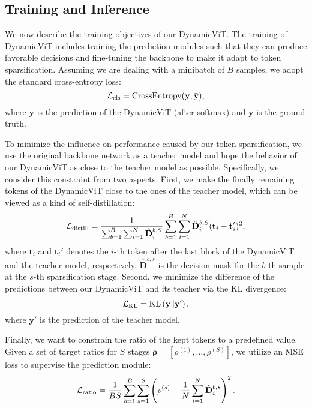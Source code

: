 \documentclass{article}
\newcommand{\dynamvit}{DynamicViT}
\DeclareMathOperator{\kld}{KL}
\DeclareMathOperator{\CE}{CrossEntropy}
\begin{document}
\subsection{Training and Inference}
We now describe the training objectives of our \dynamvit{}. The training of \dynamvit{} includes training the prediction modules such that they can produce favorable decisions and fine-tuning the backbone to make it adapt to token sparsification. Assuming we are dealing with a minibatch of $B$ samples, we adopt the standard cross-entropy loss:
\begin{equation}
    \mathcal{L}_{\rm cls} = \CE(\mathbf{y}, \bar{\mathbf{y}}),
\end{equation}
where $\mathbf{y}$ is the prediction of the \dynamvit{} (after softmax) and $\bar{\mathbf{y}}$ is the ground truth. 

To minimize the influence on performance caused by our token sparsification, we use the original backbone network as a teacher model and hope the behavior of our \dynamvit{} as close to the teacher model as possible. Specifically, we consider this constraint from two aspects. First, we make the finally remaining tokens of the \dynamvit{} close to the ones of the teacher model, which can be viewed as a kind of self-distillation:
\begin{equation}
    \mathcal{L}_{\rm distill} = \frac{1}{\sum_{b=1}^B\sum_{i=1}^N \hat{\mathbf{D}}_i^{b, S}}\sum_{b=1}^B\sum_{i=1}^N \hat{\mathbf{D}}_i^{b, S} (\mathbf{t}_{i} - \mathbf{t}_i')^2,
\end{equation}
where $\mathbf{t}_{i}$ and $\mathbf{t}_i'$ denotes the $i$-th token after the last block of the \dynamvit{} and the teacher model, respectively. $\hat{\mathbf{D}}^{b, s}$ is the decision mask for the $b$-th sample at the $s$-th sparsification stage. Second, we minimize the difference of the predictions between our \dynamvit{} and its teacher via the KL divergence:
\begin{equation}
    \mathcal{L}_{\rm KL} = \kld\left(\mathbf{y}\| \mathbf{y}'\right),
\end{equation}
where $\mathbf{y}'$ is the prediction of the teacher model. 

Finally, we want to constrain the ratio of the kept tokens to a predefined value. Given a set of target ratios for $S$ stages $\bm{\rho}=[\rho^{(1)}, \ldots, \rho^{(S)}]$, we utilize an MSE loss to supervise the prediction module:
\begin{equation}
    \mathcal{L}_{\rm ratio} = \frac{1}{BS}\sum_{b=1}^{B}\sum_{s=1}^S \left(\rho^{(s)} - \frac{1}{N}\sum_{i=1}^N\hat{\mathbf{D}}^{b, s}_i\right)^2.
\end{equation}
\end{document}
